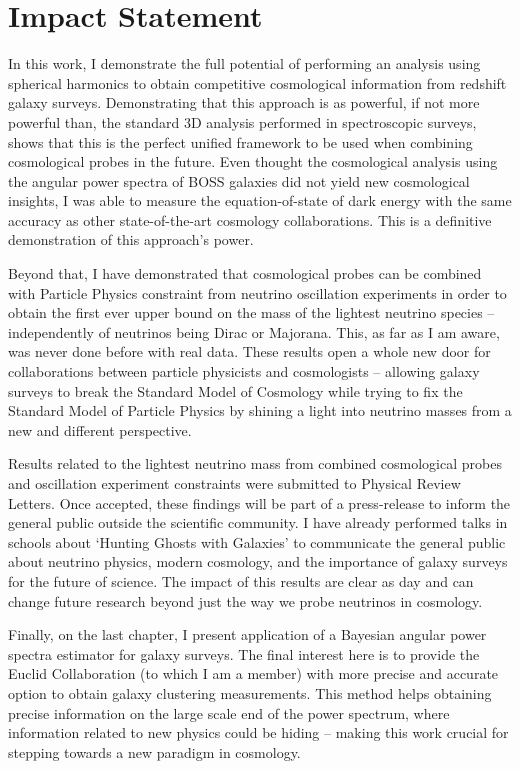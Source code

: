 \chapter*{Impact Statement}
\label{sec:impact}
\vspace*{-10mm}

In this work, I demonstrate the full potential of performing an analysis using spherical harmonics to obtain competitive cosmological information from redshift galaxy surveys. Demonstrating that this approach is as powerful, if not more powerful than, the standard 3D analysis performed in spectroscopic surveys, shows that this is the perfect unified framework to be used when combining cosmological probes in the future. Even thought the cosmological analysis using the angular power spectra of BOSS galaxies did not yield new cosmological insights, I was able to measure the equation-of-state of dark energy with the same accuracy as other state-of-the-art cosmology collaborations. This is a definitive demonstration of this approach's power.

\qquad Beyond that, I have demonstrated that cosmological probes can be combined with Particle Physics constraint from neutrino oscillation experiments in order to obtain the first ever upper bound on the mass of the lightest neutrino species -- independently of neutrinos being Dirac or Majorana. This, as far as I am aware, was never done before with real data. These results open a whole new door for collaborations between particle physicists and cosmologists -- allowing galaxy surveys to break the Standard Model of Cosmology while trying to fix the Standard Model of Particle Physics by shining a light into neutrino masses from a new and different perspective.

\qquad Results related to the lightest neutrino mass from combined cosmological probes and oscillation experiment constraints were submitted to Physical Review Letters. Once accepted, these findings will be part of a press-release to inform the general public outside the scientific community. I have already performed talks in schools about `Hunting Ghosts with Galaxies' to communicate the general public about neutrino physics, modern cosmology, and the importance of galaxy surveys for the future of science. The impact of this results are clear as day and can change future research beyond just the way we probe neutrinos in cosmology.

\qquad Finally, on the last chapter, I present application of a Bayesian angular power spectra estimator for galaxy surveys. The final interest here is to provide the Euclid Collaboration (to which I am a member) with more precise and accurate option to obtain galaxy clustering measurements. This method helps obtaining precise information on the large scale end of the power spectrum, where information related to new physics could be hiding -- making this work crucial for stepping towards a new paradigm in cosmology.